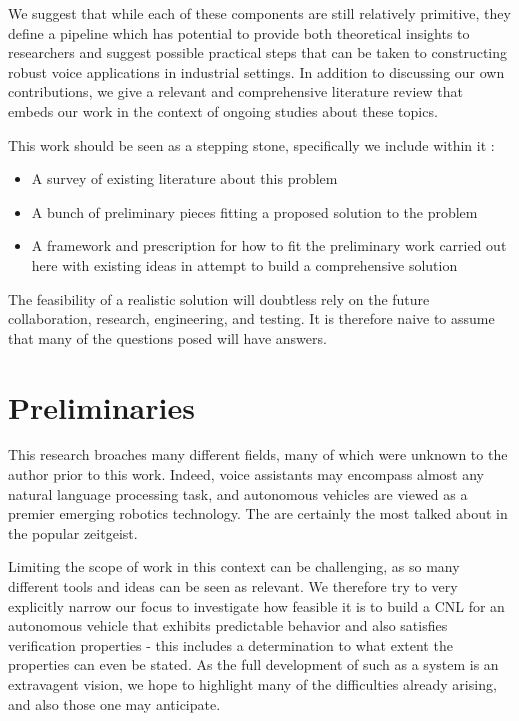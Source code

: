 \documentclass{article}
\begin{document}

We suggest that while each of these components are still relatively primitive,
they define a pipeline which has potential to provide both theoretical insights
to researchers and suggest possible practical steps that can be taken to
constructing robust voice applications in industrial settings. In addition to
discussing our own contributions, we give a relevant and comprehensive literature
review that embeds our work in the context of ongoing studies about these
topics.

This work should be seen as a stepping stone, specifically we include within it :

\begin{itemize}[noitemsep]
\item A survey of existing literature about this problem
\item A bunch of preliminary pieces fitting a proposed solution to the problem
\item A framework and prescription for how to fit the preliminary work carried
 out here with existing ideas in attempt to build a comprehensive solution
\end{itemize}

The feasibility of a realistic solution will doubtless rely on the future
collaboration, research, engineering, and testing. It is therefore naive to
assume that many of the questions posed will have answers.

\section{Preliminaries}

This research broaches many different fields, many of which were unknown to the
author prior to this work. Indeed, voice assistants may encompass almost any
natural language processing task, and autonomous vehicles are viewed as a
premier emerging robotics technology. The are certainly the most talked about in
the popular zeitgeist.

Limiting the scope of work in this context can be challenging, as so many
different tools and ideas can be seen as relevant. We therefore try to very
explicitly narrow our focus to investigate how feasible it is to build a
CNL for an autonomous vehicle that exhibits predictable behavior and also
satisfies verification properties - this includes a determination to what extent
the properties can even be stated. As the full development of such as a system
is an extravagent vision, we hope to highlight many of the difficulties already
arising, and also those one may anticipate.
\end{document}
